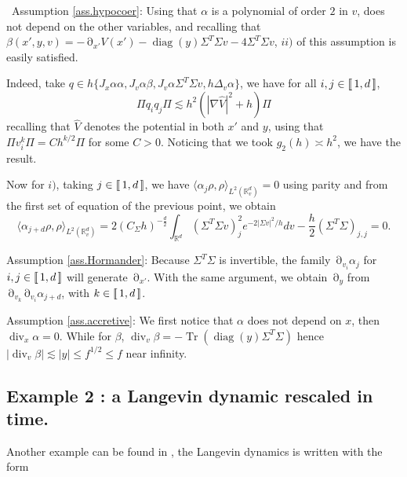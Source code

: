 \documentclass[12pt]{amsart}
\newcommand{\diag}{\operatorname{diag}}
\newcommand{\R}{\mathbb R}
\newcommand{\Tr}{{\operatorname{Tr}}}
\renewcommand{\div}{\operatorname{div}}
\def\<{\langle}
\def\>{\rangle}
\numberwithin{equation}{section}
\numberwithin{figure}{section}
\DeclareMathOperator{\p}{\partial}
\newcommand{\lb}{\operatorname{[\negthinspace [}}
\newcommand{\rb}{\operatorname{]\negthinspace ]}}
\begin{document}
\textbullet\ Assumption \ref{ass.hypocoer}: Using that $\alpha$ is a polynomial of order $2$ in $v$, does not depend on the other variables, and recalling that $\beta(x',y,v) = -\p_{x'}V(x') - \diag(y)\Sigma^T\Sigma v - 4\Sigma^T\Sigma v$, $ii)$ of this assumption is easily satisfied.

Indeed, take $q\in h\{J_x\alpha\alpha,J_v\alpha\beta,J_v\alpha\Sigma^T\Sigma v,h\Delta_v\alpha\}$, we have for all $i,j\in\lb1,d\rb$,
\begin{equation*}
\Pi q_iq_j\Pi \lesssim h^2(|\nabla \hat V|^2 + h)\Pi
\end{equation*}
recalling that $\hat V$ denotes the potential in both $x'$ and $y$, using that $\Pi v_i^k\Pi = Ch^{k/2}\Pi$ for some $C>0$. Noticing that we took $g_2(h)\asymp h^2$, we have the result.

Now for $i)$, taking $j\in\lb1,d\rb$, we have $\<\alpha_j\rho,\rho\>_{L^2(\R^d_v)} = 0$ using parity and from the first set of equation of the previous point, we obtain
\begin{equation*}
\<\alpha_{j+d}\rho,\rho\>_{L^2(\R^d_v)} = 2(C_\Sigma h)^{-\frac d2}\int_{\R^d}(\Sigma^T\Sigma v)_j^2e^{-2|\Sigma v|^2/h}dv - \frac{h}{2}(\Sigma^T\Sigma)_{j,j} = 0.
\end{equation*}

\textbullet Assumption \ref{ass.Hormander}: Because $\Sigma^T\Sigma$ is invertible, the family $\p_{v_i}\alpha_j$ for $i,j\in\lb1,d\rb$ will generate $\p_{x'}$. With the same argument, we obtain $\p_y$ from $\p_{v_k}\p_{v_i}\alpha_{j+d}$, with $k\in\lb1,d\rb$.

\textbullet Assumption \ref{ass.accretive}: We first notice that $\alpha$ does not depend on $x$, then $\div_{x}\alpha = 0$. While for $\beta$, $\div_v\beta = -\Tr(\diag(y)\Sigma^T\Sigma)$ hence $|\div_v\beta| \lesssim |y| \leq f^{1/2}\leq f$ near infinity.










\subsection{Example 2 : a Langevin dynamic rescaled in time.}\label{ssec:exampleRescaled}
Another example can be found in \cite{LeLeLaHi24}, the Langevin dynamics is written with the form
\end{document}
